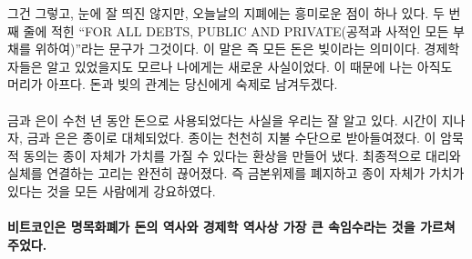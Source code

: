 \begin{comment}
	By the way, there is another interesting lesson on today's bank notes,
	hidden in plain sight. The second line reads that this is legal tender
	\enquote{FOR ALL DEBTS, PUBLIC AND PRIVATE}. What might be obvious to economists
	was surprising to me: All money is debt. My head is still hurting
	because of it, and I will leave the exploration of the relation of money
	and debt as an exercise to the reader.
\end{comment}
그건 그렇고, 눈에 잘 띄진 않지만, 오늘날의 지폐에는 흥미로운 점이 하나 있다. 
두 번째 줄에 적힌 
\enquote{FOR ALL DEBTS, PUBLIC AND PRIVATE(공적과 사적인 모든 부채를 위하여)}라는 문구가
그것이다. 
이 말은 즉 모든 돈은 빚이라는 의미이다. 
경제학자들은 알고 있었을지도 모르나 나에게는 새로운 사실이었다. 
이 때문에  나는 아직도 머리가 아프다. 
돈과 빚의 관계는 당신에게 숙제로 남겨두겠다.

\paragraph{}
\begin{comment}
	As we have seen, gold and silver were used as money for millennia. Over
	time, coins made from gold and silver were replaced by paper. Paper
	slowly became accepted as payment. This acceptance created an
	illusion --- the illusion that the paper itself has value. The final
	move was to completely sever the link between the representation and the
	actual: abolishing the gold standard and convincing everyone that the
	paper in itself is precious.
\end{comment}
금과 은이 수천 년 동안 돈으로 사용되었다는 사실을 우리는 잘 알고 있다. 
시간이 지나자, 금과 은은 종이로 대체되었다. 
종이는 천천히 지불 수단으로 받아들여졌다. 
이 암묵적 동의는 종이 자체가 가치를 가질 수 있다는 환상을 만들어 냈다. 
최종적으로 대리와 실체를 연결하는 고리는 완전히 끊어졌다.
즉 금본위제를 폐지하고 종이 자체가 가치가 있다는 것을 모든 사람에게 강요하였다.

\begin{comment}
	\paragraph{Bitcoin taught me about the history of money and the greatest sleight of
		hand in the history of economics: fiat currency.}
\end{comment}
\paragraph{비트코인은 명목화폐가 돈의 역사와 경제학 역사상 가장 큰 속임수라는 것을 가르쳐주었다.}

